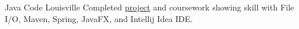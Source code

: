 {Java}{}{}
{Code Louisville}
{Completed \href{https://github.com/jacobarchambault/codeloujava}{project} and coursework showing skill with 
	File I/O, Maven, Spring, JavaFX, and Intellij Idea IDE.}
